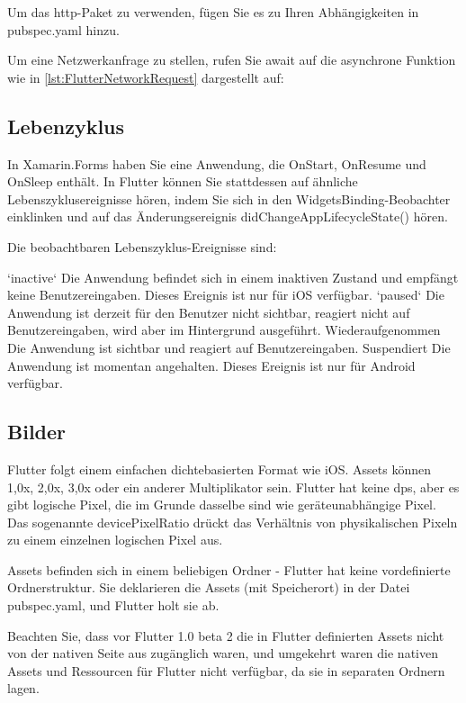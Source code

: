 Um das http-Paket zu verwenden, fügen Sie es zu Ihren Abhängigkeiten in pubspec.yaml hinzu.

Um eine Netzwerkanfrage zu stellen, rufen Sie await auf die asynchrone Funktion wie in \ref{lst:FlutterNetworkRequest} dargestellt auf:


\begin{minipage}{\linewidth}

\end{minipage}

\subsection{Lebenzyklus}
In Xamarin.Forms haben Sie eine Anwendung, die OnStart, OnResume und OnSleep enthält. In Flutter können Sie stattdessen auf ähnliche Lebenszyklusereignisse hören, indem Sie sich in den WidgetsBinding-Beobachter einklinken und auf das Änderungsereignis didChangeAppLifecycleState() hören.

Die beobachtbaren Lebenszyklus-Ereignisse sind:

`inactive`
Die Anwendung befindet sich in einem inaktiven Zustand und empfängt keine Benutzereingaben. Dieses Ereignis ist nur für iOS verfügbar.
`paused`
Die Anwendung ist derzeit für den Benutzer nicht sichtbar, reagiert nicht auf Benutzereingaben, wird aber im Hintergrund ausgeführt.
Wiederaufgenommen
Die Anwendung ist sichtbar und reagiert auf Benutzereingaben.
Suspendiert
Die Anwendung ist momentan angehalten. Dieses Ereignis ist nur für Android verfügbar.
\subsection{Bilder}
Flutter folgt einem einfachen dichtebasierten Format wie iOS. Assets können 1,0x, 2,0x, 3,0x oder ein anderer Multiplikator sein. Flutter hat keine dps, aber es gibt logische Pixel, die im Grunde dasselbe sind wie geräteunabhängige Pixel. Das sogenannte devicePixelRatio drückt das Verhältnis von physikalischen Pixeln zu einem einzelnen logischen Pixel aus.

Assets befinden sich in einem beliebigen Ordner - Flutter hat keine vordefinierte Ordnerstruktur. Sie deklarieren die Assets (mit Speicherort) in der Datei pubspec.yaml, und Flutter holt sie ab.

Beachten Sie, dass vor Flutter 1.0 beta 2 die in Flutter definierten Assets nicht von der nativen Seite aus zugänglich waren, und umgekehrt waren die nativen Assets und Ressourcen für Flutter nicht verfügbar, da sie in separaten Ordnern lagen.

